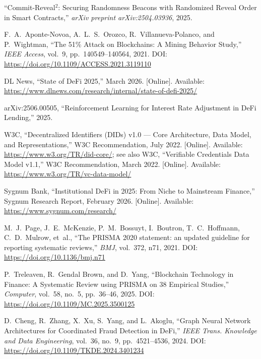 \documentclass[12pt,a4paper]{report}
\begin{document}
{\begin{enumerate}[label={[\arabic*]}]
\item ``Commit-Reveal$^2$: Securing Randomness Beacons with Randomized Reveal Order in Smart Contracts,'' \textit{arXiv preprint arXiv:2504.03936}, 2025.

\item F.~A.~Aponte-Novoa, A.~L.~S.~Orozco, R.~Villanueva-Polanco, and P.~Wightman, ``The 51\% Attack on Blockchains: A Mining Behavior Study,'' \textit{IEEE Access}, vol.~9, pp.~140549--140564, 2021. DOI: \url{https://doi.org/10.1109/ACCESS.2021.3119110}

\item DL News, ``State of DeFi 2025,'' March 2026. [Online]. Available: \url{https://www.dlnews.com/research/internal/state-of-defi-2025/}

\item arXiv:2506.00505, ``Reinforcement Learning for Interest Rate Adjustment in DeFi Lending,'' 2025.


\item W3C, ``Decentralized Identifiers (DIDs) v1.0 --- Core Architecture, Data Model, and Representations,'' W3C Recommendation, July 2022. [Online]. Available: \url{https://www.w3.org/TR/did-core/}; see also W3C, ``Verifiable Credentials Data Model v1.1,'' W3C Recommendation, March 2022. [Online]. Available: \url{https://www.w3.org/TR/vc-data-model/}

\item Sygnum Bank, ``Institutional DeFi in 2025: From Niche to Mainstream Finance,'' Sygnum Research Report, February 2026. [Online]. Available: \url{https://www.sygnum.com/research/}

\item M.~J.~Page, J.~E.~McKenzie, P.~M.~Bossuyt, I.~Boutron, T.~C.~Hoffmann, C.~D.~Mulrow, et~al., ``The PRISMA 2020 statement: an updated guideline for reporting systematic reviews,'' \textit{BMJ}, vol.~372, n71, 2021. DOI: \url{https://doi.org/10.1136/bmj.n71}

\item P.~Treleaven, R.~Gendal Brown, and D.~Yang, ``Blockchain Technology in Finance: A Systematic Review using PRISMA on 38 Empirical Studies,'' \textit{Computer}, vol.~58, no.~5, pp.~36--46, 2025. DOI: \url{https://doi.org/10.1109/MC.2025.3500125}

\item D.~Cheng, R.~Zhang, X.~Xu, S.~Yang, and L.~Akoglu, ``Graph Neural Network Architectures for Coordinated Fraud Detection in DeFi,'' \textit{IEEE Trans. Knowledge and Data Engineering}, vol.~36, no.~9, pp.~4521--4536, 2024. DOI: \url{https://doi.org/10.1109/TKDE.2024.3401234}


\end{enumerate}}
\end{document}
